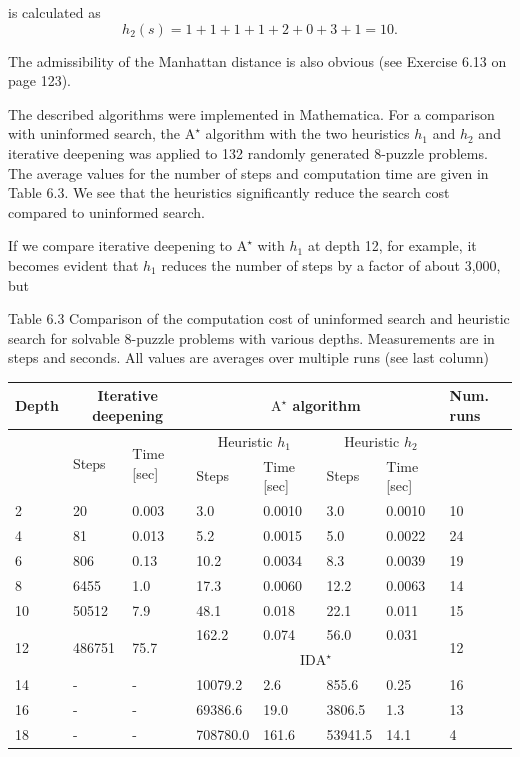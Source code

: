 \documentclass[10pt]{book}
\begin{document}
is calculated as
$$
h_{2}(s)=1+1+1+1+2+0+3+1=10 .
$$

The admissibility of the Manhattan distance is also obvious (see Exercise 6.13 on page 123).

The described algorithms were implemented in Mathematica. For a comparison with uninformed search, the $\mathrm{A}^{\star}$ algorithm with the two heuristics $h_{1}$ and $h_{2}$ and iterative deepening was applied to 132 randomly generated 8-puzzle problems. The average values for the number of steps and computation time are given in Table 6.3. We see that the heuristics significantly reduce the search cost compared to uninformed search.

If we compare iterative deepening to $\mathrm{A}^{\star}$ with $h_{1}$ at depth 12, for example, it becomes evident that $h_{1}$ reduces the number of steps by a factor of about 3,000, but

Table 6.3 Comparison of the computation cost of uninformed search and heuristic search for solvable 8-puzzle problems with various depths. Measurements are in steps and seconds. All values are averages over multiple runs (see last column)

\begin{center}
\begin{tabular}{|l|l|l|l|l|l|l|l|}
\hline
\multirow[t]{3}{*}{Depth} & \multicolumn{2}{|c|}{Iterative deepening} & \multicolumn{4}{|c|}{$\mathrm{A}^{\star}$ algorithm} & \multirow[t]{3}{*}{Num. runs} \\
\hline
 & \multirow[t]{2}{*}{Steps} & \multirow{2}{*}{Time [sec]} & \multicolumn{2}{|c|}{Heuristic $h_{1}$} & \multicolumn{2}{|c|}{Heuristic $h_{2}$} &  \\
\hline
 &  &  & Steps & Time [sec] & Steps & Time [sec] &  \\
\hline
2 & 20 & 0.003 & 3.0 & 0.0010 & 3.0 & 0.0010 & 10 \\
\hline
4 & 81 & 0.013 & 5.2 & 0.0015 & 5.0 & 0.0022 & 24 \\
\hline
6 & 806 & 0.13 & 10.2 & 0.0034 & 8.3 & 0.0039 & 19 \\
\hline
8 & 6455 & 1.0 & 17.3 & 0.0060 & 12.2 & 0.0063 & 14 \\
\hline
10 & 50512 & 7.9 & 48.1 & 0.018 & 22.1 & 0.011 & 15 \\
\hline
\multirow[t]{2}{*}{12} & \multirow[t]{2}{*}{486751} & \multirow[t]{2}{*}{75.7} & 162.2 & 0.074 & 56.0 & 0.031 & \multirow[t]{2}{*}{12} \\
\hline
 &  &  & \multicolumn{4}{|c|}{$\mathrm{IDA}^{\star}$} &  \\
\hline
14 & - & - & 10079.2 & 2.6 & 855.6 & 0.25 & 16 \\
\hline
16 & - & - & 69386.6 & 19.0 & 3806.5 & 1.3 & 13 \\
\hline
18 & - & - & 708780.0 & 161.6 & 53941.5 & 14.1 & 4 \\
\hline
\end{tabular}
\end{center}
\end{document}
